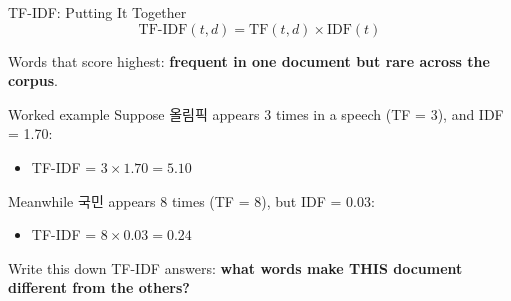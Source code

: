 \documentclass[aspectratio=169,11pt]{beamer}
\begin{document}
\begin{frame}{TF-IDF: Putting It Together}
    $$\text{TF-IDF}(t, d) = \text{TF}(t, d) \times \text{IDF}(t)$$

    \vspace{0.3cm}

    Words that score highest: \textbf{frequent in one document but rare across the corpus}.

    \vspace{0.4cm}

    \begin{exampleblock}{Worked example}
        Suppose 올림픽 appears 3 times in a speech (TF = 3), and IDF = 1.70:
        \begin{itemize}
            \item TF-IDF = $3 \times 1.70 = 5.10$
        \end{itemize}

        \vspace{0.15cm}

        Meanwhile 국민 appears 8 times (TF = 8), but IDF = 0.03:
        \begin{itemize}
            \item TF-IDF = $8 \times 0.03 = 0.24$
        \end{itemize}
    \end{exampleblock}

    \vspace{0.3cm}

    \begin{block}{Write this down}
        TF-IDF answers: \textbf{what words make THIS document different from the others?}
    \end{block}
\end{frame}
\end{document}
